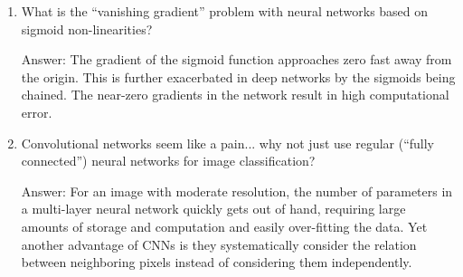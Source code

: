 \documentclass{article}
\newenvironment{answer}{\par\begingroup\color{gre}Answer: }{\endgroup}
\begin{document}
\begin{enumerate}
\item What is the ``vanishing gradient'' problem with neural networks based on sigmoid non-linearities?
\begin{answer}
    The gradient of the sigmoid function approaches zero fast away from the origin. This is further exacerbated in deep networks by the sigmoids being chained. The near-zero gradients in the network result in high computational error.
\end{answer}

\item{Convolutional networks seem like a pain... why not just use regular (``fully connected'') neural networks for image classification?}
\begin{answer}
    For an image with moderate resolution, the number of parameters in a multi-layer neural network quickly gets out of hand, requiring large amounts of storage and computation and easily over-fitting the data. Yet another advantage of CNNs is they systematically consider the relation between neighboring pixels instead of considering them independently.
\end{answer}

\end{enumerate}
\end{document}
